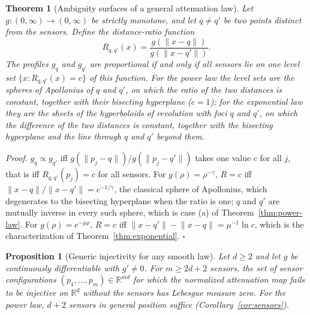 \documentclass{article}
\newtheorem{theorem}{\bf Theorem}
\newtheorem{proposition}{\bf Proposition}
\begin{document}
\begin{theorem}[Ambiguity surfaces of a general attenuation law] \label{thm:general-ambiguity}
Let $g : (0, \infty) \to (0, \infty)$ be strictly monotone, and let $q \ne q'$ be two points distinct from the sensors. Define the distance-ratio function \[
R_{q,q'}(x) = \frac{g(\lVert x - q \rVert)}{g(\lVert x - q' \rVert)} .
\] The profiles $g_q$ and $g_{q'}$ are proportional if and only if all sensors lie on one level set $\{x : R_{q,q'}(x) = c\}$ of this function. For the power law the level sets are the spheres of Apollonius of $q$ and $q'$, on which the ratio of the two distances is constant, together with their bisecting hyperplane ($c = 1$); for the exponential law they are the sheets of the hyperboloids of revolution with foci $q$ and $q'$, on which the difference of the two distances is constant, together with the bisecting hyperplane and the line through $q$ and $q'$ beyond them.
\end{theorem}

\textit{Proof.} $g_q \propto g_{q'}$ iff $g(\lVert p_j - q \rVert)/g(\lVert p_j - q' \rVert)$ takes one value $c$ for all $j$, that is iff $R_{q,q'}(p_j) = c$ for all sensors. For $g(\rho) = \rho^{-\gamma}$, $R = c$ iff $\lVert x - q \rVert / \lVert x - q' \rVert = c^{-1/\gamma}$, the classical sphere of Apollonius, which degenerates to the bisecting hyperplane when the ratio is one; $q$ and $q'$ are mutually inverse in every such sphere, which is case (a) of Theorem~\ref{thm:power-law}. For $g(\rho) = e^{-\mu\rho}$, $R = c$ iff $\lVert x - q' \rVert - \lVert x - q \rVert = \mu^{-1} \ln c$, which is the characterization of Theorem~\ref{thm:exponential}. $\square$

\begin{proposition}[Generic injectivity for any smooth law] \label{prop:generic}
Let $d \ge 2$ and let $g$ be continuously differentiable with $g' \neq 0$. For $m \ge 2d + 2$ sensors, the set of sensor configurations $(p_1, \dots, p_m) \in \mathbb{R}^{md}$ for which the normalized attenuation map fails to be injective on $\mathbb{R}^{d}$ without the sensors has Lebesgue measure zero. For the power law, $d + 2$ sensors in general position suffice (Corollary~\ref{cor:sensors}).
\end{proposition}
\end{document}
